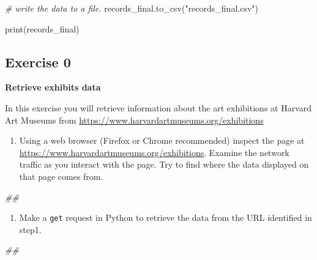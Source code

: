 \documentclass[
]{book}
\newenvironment{Shaded}{\begin{snugshade}}{\end{snugshade}}
\newcommand{\BuiltInTok}[1]{#1}
\newcommand{\CommentTok}[1]{\textcolor[rgb]{0.56,0.35,0.01}{\textit{#1}}}
\newcommand{\NormalTok}[1]{#1}
\newcommand{\StringTok}[1]{\textcolor[rgb]{0.31,0.60,0.02}{#1}}
\providecommand{\tightlist}{%
  \setlength{\itemsep}{0pt}\setlength{\parskip}{0pt}}
\begin{document}
\begin{Shaded}
\begin{Highlighting}[]
\CommentTok{\# write the data to a file.}
\NormalTok{records\_final.to\_csv(}\StringTok{"records\_final.csv"}\NormalTok{)}
\end{Highlighting}
\end{Shaded}

\begin{Shaded}
\begin{Highlighting}[]
\BuiltInTok{print}\NormalTok{(records\_final)}
\end{Highlighting}
\end{Shaded}

\hypertarget{exercise-0-4}{%
\subsection{Exercise 0}\label{exercise-0-4}}

\textbf{Retrieve exhibits data}

In this exercise you will retrieve information about the art exhibitions at Harvard Art Museums from \url{https://www.harvardartmuseums.org/exhibitions}

\begin{enumerate}
\def\labelenumi{\arabic{enumi}.}
\tightlist
\item
  Using a web browser (Firefox or Chrome recommended) inspect the
  page at \url{https://www.harvardartmuseums.org/exhibitions}. Examine
  the network traffic as you interact with the page. Try to find
  where the data displayed on that page comes from.
\end{enumerate}

\begin{Shaded}
\begin{Highlighting}[]
\CommentTok{\#\#}
\end{Highlighting}
\end{Shaded}

\begin{enumerate}
\def\labelenumi{\arabic{enumi}.}
\setcounter{enumi}{1}
\tightlist
\item
  Make a \texttt{get} request in Python to retrieve the data from the URL
  identified in step1.
\end{enumerate}

\begin{Shaded}
\begin{Highlighting}[]
\CommentTok{\#\#}
\end{Highlighting}
\end{Shaded}
\end{document}
